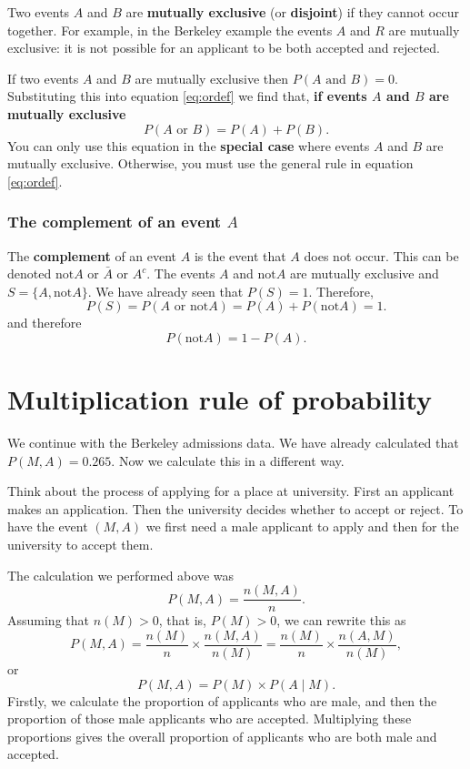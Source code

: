 \documentclass[
  british,
]{book}
\begin{document}
Two events \(A\) and \(B\) are \textbf{mutually exclusive} (or \textbf{disjoint}) if they cannot occur together. For example, in the Berkeley example the events \(A\) and \(R\) are mutually exclusive: it is not possible for an applicant to be both accepted and rejected.

If two events \(A\) and \(B\) are mutually exclusive then \(P(A \mbox{ and } B)=0\). Substituting this into equation \eqref{eq:ordef} we find that, \textbf{if events \(A\) and \(B\) are mutually exclusive}
\begin{equation}
P(A \mbox{ or } B) = P(A) + P(B). 
\label{eq:mut}
\end{equation}
You can only use this equation in the \textbf{special case} where events \(A\) and \(B\) are mutually exclusive. Otherwise, you must use the general rule in equation \eqref{eq:ordef}.

\hypertarget{the-complement-of-an-event-a}{%
\subsubsection*{\texorpdfstring{The complement of an event \(A\)}{The complement of an event A}}\label{the-complement-of-an-event-a}}

The \textbf{complement} of an event \(A\) is the event that \(A\) does not occur. This can be denoted \(\mbox{not}A\) or \(\bar{A}\) or \(A^c\). The events \(A\) and \(\mbox{not}A\) are mutually exclusive and \(S=\{A, \mbox{not}A\}\). We have already seen that \(P(S) = 1\). Therefore,
\[ P(S)=P(A \mbox{ or } \mbox{not}A) = P(A) + P(\mbox{not}A) = 1. \]
and therefore
\[ P(\mbox{not}A) = 1 - P(A). \]

\hypertarget{multrule}{%
\section{Multiplication rule of probability}\label{multrule}}

We continue with the Berkeley admissions data. We have already calculated that \(P(M , A)=0.265\). Now we calculate this in a different way.

Think about the process of applying for a place at university. First an applicant makes an application. Then the university decides whether to accept or reject. To have the event \((M, A)\) we first need a male applicant to apply and then for the university to accept them.

The calculation we performed above was
\[ P(M , A) = \frac{n(M , A)}{n}. \]
Assuming that \(n(M)>0\), that is, \(P(M)>0\), we can rewrite this as
\[ P(M , A) = \frac{n(M)}{n} \times \frac{n(M , A)}{n(M)} = \frac{n(M)}{n} \times \frac{n(A , M)}{n(M)}, \]
or
\[ P(M , A) = P(M) \times P(A \mid M). \]
Firstly, we calculate the proportion of applicants who are male, and then the proportion of those male applicants who are accepted. Multiplying these proportions gives the overall proportion of applicants who are both male and accepted.
\end{document}
